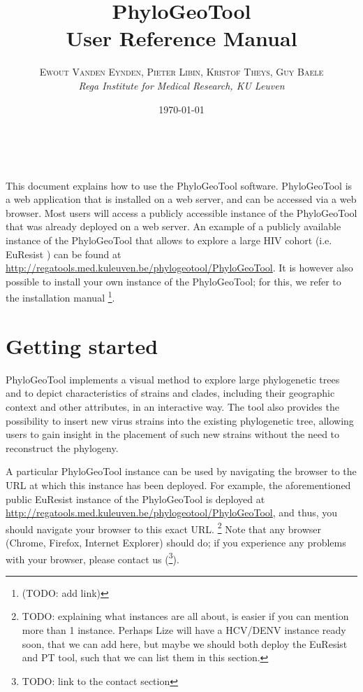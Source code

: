 \documentclass[a4paper, 11pt]{article} %
\title{\textbf{PhyloGeoTool}\\ %
User Reference Manual} %
\author{\textsc{Ewout Vanden Eynden, Pieter Libin, Kristof Theys, Guy Baele} %
\\{\textit{Rega Institute for Medical Research, KU Leuven}}} %
\date{\today} %
\makeatletter
\renewcommand{\maketitle}{ %
\begin{flushright} %
{\LARGE\@title} %

\vspace{50pt} %

{\large\@author} %
\\\@date %

\vspace{40pt} %
\end{flushright}
}
\makeatother
\begin{document}
\maketitle %

\vspace{30pt} %

\tableofcontents
\newpage

This document explains how to use the PhyloGeoTool software. PhyloGeoTool is a web application that is installed on a web server, and can be accessed via a web browser. 
Most users will access a publicly accessible instance of the PhyloGeoTool that was already deployed on a web server. 
An example of a publicly available instance of the PhyloGeoTool that allows to explore a large HIV cohort (i.e. EuResist \cite{Zazzi2012}) can be found at \url{http://regatools.med.kuleuven.be/phylogeotool/PhyloGeoTool}.
It is however also possible to install your own instance of the PhyloGeoTool; for this, we refer to the installation manual \footnote{(TODO: add link)}.


\section{Getting started}

PhyloGeoTool implements a visual method to explore large phylogenetic trees and to depict characteristics of strains and clades, including their geographic context and other attributes, in an interactive way.
The tool also provides the possibility to insert new virus strains into the existing phylogenetic tree, allowing users to gain insight in the placement of such new strains without the need to reconstruct the phylogeny.

A particular PhyloGeoTool instance can be used by navigating the browser to the URL at which this instance has been deployed. For example, the aforementioned public EuResist instance of the PhyloGeoTool is deployed at \url{http://regatools.med.kuleuven.be/phylogeotool/PhyloGeoTool}, and thus, you should navigate your browser to this exact URL.
\footnote{TODO: explaining what instances are all about, is easier if you can mention more than 1 instance. 
Perhaps Lize will have a HCV/DENV instance ready soon, that we can add here, but maybe we should both deploy the EuResist and PT tool, such that we can list them in this section.}
Note that any browser (Chrome, Firefox, Internet Explorer) should do; if you experience any problems with your browser, please contact us (\footnote{TODO: link to the contact section}).
\end{document}

